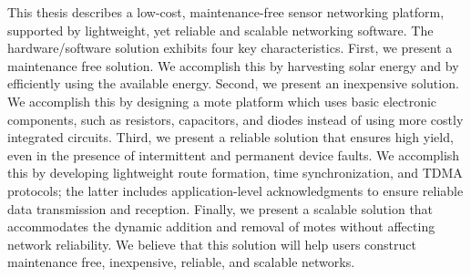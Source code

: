 



This thesis describes a low-cost, maintenance-free sensor networking platform, supported by lightweight, yet reliable and scalable networking software. The hardware/software solution exhibits four key characteristics. First, we present a maintenance free solution. We accomplish this by harvesting solar energy and by efficiently using the available energy. Second, we present an inexpensive solution. We accomplish this by designing a mote platform which uses basic electronic components, such as resistors, capacitors, and diodes instead of using more costly integrated circuits. Third, we present a reliable solution that ensures high yield, even in the presence of  intermittent and permanent device faults. We accomplish this by developing lightweight route formation, time synchronization, and TDMA protocols; the latter includes application-level acknowledgments to ensure reliable data transmission and reception. Finally, we present a scalable solution that accommodates the dynamic addition and removal of motes without affecting network reliability. We believe that this solution will help users construct maintenance free, inexpensive, reliable, and scalable networks.



